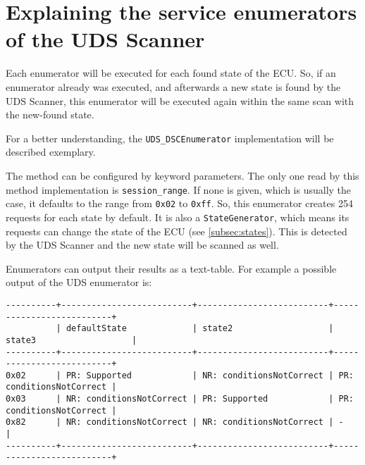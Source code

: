 \section{Explaining the service enumerators of the UDS Scanner}
\label{sec:enumerators}

Each enumerator will be executed for each found state of the ECU. So, if an enumerator already was executed, and afterwards a new state is found by the UDS Scanner, this enumerator will be executed again within the same scan with the new-found state.

For a better understanding, the \texttt{UDS_DSCEnumerator} implementation will be described exemplary.


The method can be configured by keyword parameters. The only one read by this method implementation is \texttt{session_range}. If none is given, which is usually the case, it defaults to the range from \texttt{0x02} to \texttt{0xff}. So, this enumerator creates 254 requests for each state by default. It is also a \texttt{StateGenerator}, which means its requests can change the state of the ECU (see \autoref{subsec:states}). This is detected by the UDS Scanner and the new state will be scanned as well.

Enumerators can output their results as a text-table. For example a possible output of the UDS enumerator is:

\begin{samepage}
\begin{verbatim}
----------+--------------------------+--------------------------+--------------------------+
          | defaultState             | state2                   | state3                   | 
----------+--------------------------+--------------------------+--------------------------+
0x02      | PR: Supported            | NR: conditionsNotCorrect | PR: conditionsNotCorrect | 
0x03      | NR: conditionsNotCorrect | PR: Supported            | PR: conditionsNotCorrect | 
0x82      | NR: conditionsNotCorrect | NR: conditionsNotCorrect | -                        | 
----------+--------------------------+--------------------------+--------------------------+
\end{verbatim}
\end{samepage}

